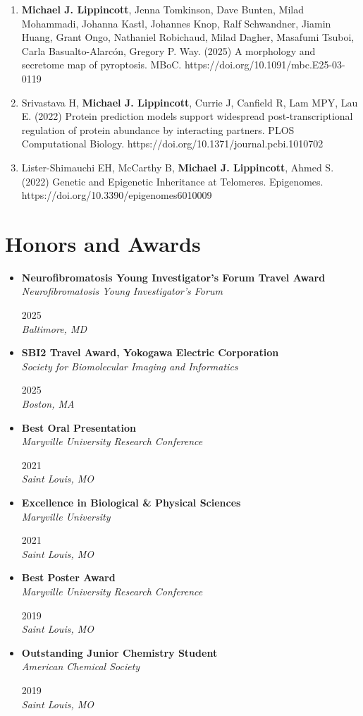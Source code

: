 \documentclass[10.5pt,letterpaper]{article}
\newcommand{\subheadingskip}{3pt}
\newcommand{\rightcolwidth}{1.3in}
\newcommand{\resumeSubheading}[4]{%
  \vspace{\subheadingskip}\item[]
  \begingroup\rightskip0pt\parfillskip0pt
  \noindent\begin{minipage}[t]{\dimexpr\textwidth-\rightcolwidth-6pt\relax}
    \raggedright\textbf{#1}\\
    \textit{\small\color{muted}#3}
  \end{minipage}%
  \hfill
  \begin{minipage}[t]{\rightcolwidth}
    \raggedleft\textcolor{accent}{\small #2}\\
    \textit{\small\color{muted}#4}
  \end{minipage}
  \par\endgroup
}
\begin{document}
\begin{enumerate}[label=\arabic*.,leftmargin=1.6em,itemsep=5pt,topsep=3pt]
    \item {\textbf{Michael J. Lippincott}, Jenna Tomkinson, Dave Bunten, Milad Mohammadi, Johanna Kastl, Johannes Knop, Ralf Schwandner, Jiamin Huang, Grant Ongo, Nathaniel Robichaud, Milad Dagher, Masafumi Tsuboi, Carla Basualto-Alarcón, Gregory P. Way. (2025) A morphology and secretome map of pyroptosis. MBoC. https://doi.org/10.1091/mbc.E25-03-0119 }
    \item {Srivastava H, \textbf{Michael J. Lippincott}, Currie J, Canfield R, Lam MPY, Lau E. (2022) Protein prediction models support widespread post-transcriptional regulation of protein abundance by interacting partners. PLOS Computational Biology. https://doi.org/10.1371/journal.pcbi.1010702 }
    \item {Lister-Shimauchi EH, McCarthy B, \textbf{Michael J. Lippincott}, Ahmed S. (2022) Genetic and Epigenetic Inheritance at Telomeres. Epigenomes. https://doi.org/10.3390/epigenomes6010009 }

    \end{enumerate}

\section{Honors and Awards}
  {\renewcommand{\subheadingskip}{2pt}
  \begin{itemize}[leftmargin=0pt,label={},itemsep=0pt,topsep=2pt,parsep=0pt]
    \resumeSubheading
      {Neurofibromatosis Young Investigator's Forum Travel Award}{2025}
      {Neurofibromatosis Young Investigator's Forum}{Baltimore, MD}
    \resumeSubheading
      {SBI2 Travel Award, Yokogawa Electric Corporation}{2025}
      {Society for Biomolecular Imaging and Informatics}{Boston, MA}
    \resumeSubheading
      {Best Oral Presentation}{2021}
      {Maryville University Research Conference}{Saint Louis, MO}
    \resumeSubheading
      {Excellence in Biological \& Physical Sciences}{2021}
      {Maryville University}{Saint Louis, MO}
    \resumeSubheading
      {Best Poster Award}{2019}
      {Maryville University Research Conference}{Saint Louis, MO}
    \resumeSubheading
      {Outstanding Junior Chemistry Student}{2019}
      {American Chemical Society}{Saint Louis, MO}
  \end{itemize}}

\end{document}
